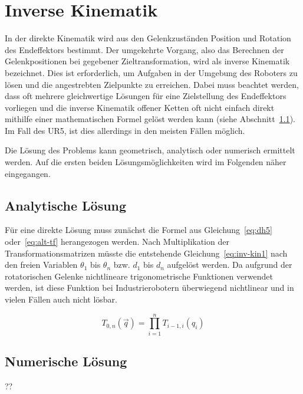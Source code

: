 \cleardoublepage


\chapter{Inverse Kinematik}\label{ch:inverse-kinematik}

In der direkte Kinematik wird aus den Gelenkzuständen Position und Rotation des Endeffektors bestimmt.
Der umgekehrte Vorgang, also das Berechnen der Gelenkpositionen bei gegebener Zieltransformation, wird als inverse Kinematik bezeichnet.
Dies ist erforderlich, um Aufgaben in der Umgebung des Roboters zu lösen und die angestrebten Zielpunkte zu erreichen.
Dabei muss beachtet werden, dass oft mehrere gleichwertige Lösungen für eine Zielstellung des Endeffektors vorliegen und die inverse Kinematik offener Ketten oft nicht einfach direkt mithilfe einer mathematischen Formel gelöst werden kann (siehe Abschnitt~\ref{sec:analytische-losung}).
Im Fall des UR5, ist dies allerdings in den meisten Fällen möglich.

Die Lösung des Problems kann geometrisch, analytisch oder numerisch ermittelt werden.
Auf die ersten beiden Lösungsmöglichkeiten wird im Folgenden näher eingegangen.


\section{Analytische Lösung}\label{sec:analytische-losung}

Für eine direkte Lösung muss zunächst die Formel aus Gleichung~\ref{eq:dh5} oder~\ref{eq:alt-tf} herangezogen werden.
Nach Multiplikation der Transformationsmatrizen müsste die entstehende Gleichung~\ref{eq:inv-kin1} nach den freien Variablen $\theta_1$ bis $\theta_n$ bzw. $d_1$ bis $d_n$ aufgelöst werden.
Da aufgrund der rotatorischen Gelenke nichtlineare trigonometrische Funktionen verwendet werden, ist diese Funktion bei Industrierobotern überwiegend nichtlinear und in vielen Fällen auch nicht lösbar.

\begin{equation}
    T_{0,n}(\overrightarrow{q}) = \prod_{i=1}^{n} T_{i-1,i}(q_i)     \label{eq:inv-kin1}
\end{equation}


\section{Numerische Lösung}

??


